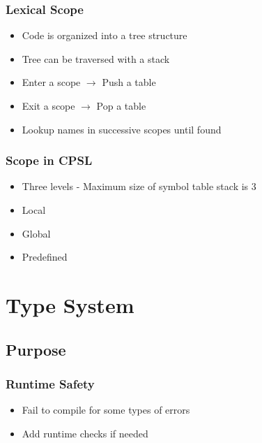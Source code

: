 \documentclass[usepdftitle=false,professionalfonts,compress ]{beamer}
\begin{document}
{
\begin{frame}\frametitle{Lexical Scope}

	\begin{itemize}
	\item Code is organized into a tree structure
			\item Tree can be traversed with a stack
			\item Enter a scope $\rightarrow$ Push a table
			\item Exit a scope $\rightarrow$ Pop a table
			\item Lookup names in successive scopes until found
				\end{itemize}

\end{frame}}







{
\begin{frame}\frametitle{Scope in CPSL}

	\begin{itemize}
	\item Three levels - Maximum size of symbol table stack is 3
			\item Local
			\item Global
			\item Predefined
				\end{itemize}

\end{frame}}







\section{Type System}
		
\subsection{Purpose}

{
\begin{frame}\frametitle{Runtime Safety}

	\begin{itemize}
	\item Fail to compile for some types of errors
			\item Add runtime checks if needed
				\end{itemize}

\end{frame}}
\end{document}

